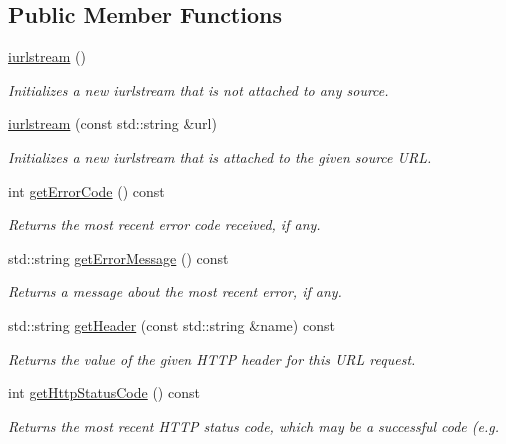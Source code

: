 \subsection*{Public Member Functions}
\begin{DoxyCompactItemize}
\item 
\mbox{\hyperlink{classiurlstream_aa78011981facda77bed9acf0e88ebdab}{iurlstream}} ()
\begin{DoxyCompactList}\small\item\em Initializes a new iurlstream that is not attached to any source. \end{DoxyCompactList}\item 
\mbox{\hyperlink{classiurlstream_a5fa5ba70cbe8c2ad3f93876c381464cb}{iurlstream}} (const std\+::string \&url)
\begin{DoxyCompactList}\small\item\em Initializes a new iurlstream that is attached to the given source U\+RL. \end{DoxyCompactList}\item 
int \mbox{\hyperlink{classiurlstream_a9e79924a3e50273b08ab5b3a8c12a221}{get\+Error\+Code}} () const
\begin{DoxyCompactList}\small\item\em Returns the most recent error code received, if any. \end{DoxyCompactList}\item 
std\+::string \mbox{\hyperlink{classiurlstream_adf0cc934eff26878cdf2018259997a4a}{get\+Error\+Message}} () const
\begin{DoxyCompactList}\small\item\em Returns a message about the most recent error, if any. \end{DoxyCompactList}\item 
std\+::string \mbox{\hyperlink{classiurlstream_a736d777b29179f52ba753317d84b1087}{get\+Header}} (const std\+::string \&name) const
\begin{DoxyCompactList}\small\item\em Returns the value of the given H\+T\+TP header for this U\+RL request. \end{DoxyCompactList}\item 
int \mbox{\hyperlink{classiurlstream_ab6c069ef77f1319830dcfd90eed6a2ce}{get\+Http\+Status\+Code}} () const
\begin{DoxyCompactList}\small\item\em Returns the most recent H\+T\+TP status code, which may be a successful code (e.\+g. \end{DoxyCompactList}\item 

\end{DoxyCompactItemize}
